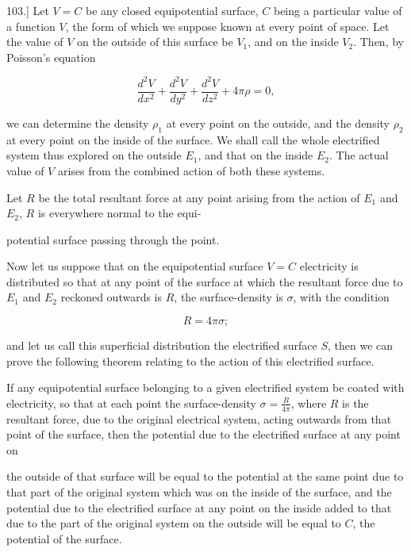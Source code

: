 \documentclass[11pt,a4paper]{article}
\begin{document}
103.] Let $V=C$ be any closed equipotential surface, $C$ being a particular value of a function $V$, the form of which we suppose known at every point of space. Let the value of $V$ on the outside of this surface be $V_1$, and on the inside $V_2$. Then, by Poisson's equation

\begin{equation}\tag{1}
\frac{d^2V}{dx^2}+\frac{d^2V}{dy^2}+\frac{d^2V}{dz^2}+4\pi\rho=0,
\end{equation}

we can determine the density $\rho_1$ at every point on the outside, and the density $\rho_2$ at every point on the inside of the surface. We shall call the whole electrified system thus explored on the outside $E_1$, and that on the inside $E_2$. The actual value of $V$ arises from the combined action of both these systems.

Let $R$ be the total resultant force at any point arising from the action of $E_1$ and $E_2$, $R$ is everywhere normal to the equi-

potential surface passing through the point.

Now let us suppose that on the equipotential surface $V=C$ electricity is distributed so that at any point of the surface at which the resultant force due to $E_1$ and $E_2$ reckoned outwards is $R$, the surface-density is $\sigma$, with the condition

\begin{equation}\tag{2}
R=4\pi\sigma;
\end{equation}

and let us call this superficial distribution the electrified surface $S$, then we can prove the following theorem relating to the action of this electrified surface.

If any equipotential surface belonging to a given electrified system be coated with electricity, so that at each point the surface-density $\sigma=\frac{R}{4\pi}$, where $R$ is the resultant force, due to the original electrical system, acting outwards from that point of the surface, then the potential due to the electrified surface at any point on

the outside of that surface will be equal to the potential at the same point due to that part of the original system which was on the inside of the surface, and the potential due to the electrified surface at any point on the inside added to that due to the part of the original system on the outside will be equal to $C$, the potential of the surface.
\end{document}
